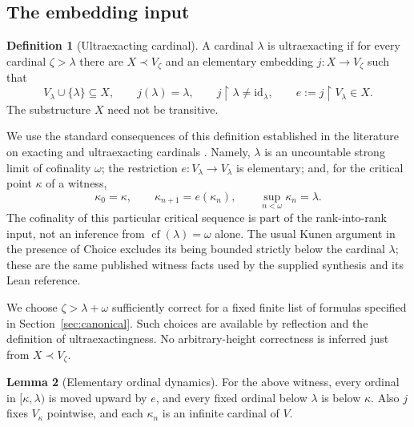 \documentclass[11pt,letterpaper]{article}
\theoremstyle{definition}
\newtheorem{definition}{Definition}[section]
\newtheorem{lemma}[definition]{Lemma}
\numberwithin{equation}{section}
\newcommand{\cf}{\operatorname{cf}}
\newcommand{\id}{\mathrm{id}}
\newcommand{\restr}{\mathbin{\upharpoonright}}
\begin{document}
\subsection{The embedding input}

\begin{definition}[Ultraexacting cardinal]
A cardinal $\lambda$ is ultraexacting if for every cardinal $\zeta>\lambda$ there are $X\prec V_\zeta$ and an elementary embedding $j:X\to V_\zeta$ such that
\[
 V_\lambda\cup\{\lambda\}\subseteq X,\qquad j(\lambda)=\lambda,
 \qquad j\restr\lambda\ne\id_\lambda,
 \qquad e:=j\restr V_\lambda\in X.
\]
The substructure $X$ need not be transitive.
\end{definition}

We use the standard consequences of this definition established in the literature on exacting and ultraexacting cardinals \cite{abl,abgl}. Namely, $\lambda$ is an uncountable strong limit of cofinality $\omega$; the restriction $e:V_\lambda\to V_\lambda$ is elementary; and, for the critical point $\kappa$ of a witness,
\begin{equation}\label{eq:crit}
 \kappa_0=\kappa,\qquad \kappa_{n+1}=e(\kappa_n),\qquad
 \sup_{n<\omega}\kappa_n=\lambda.
\end{equation}
The cofinality of this particular critical sequence is part of the rank-into-rank input, not an inference from $\cf(\lambda)=\omega$ alone. The usual Kunen argument in the presence of Choice excludes its being bounded strictly below the cardinal $\lambda$; these are the same published witness facts used by the supplied synthesis and its Lean reference.

We choose $\zeta>\lambda+\omega$ sufficiently correct for a fixed finite list of formulas specified in Section~\ref{sec:canonical}. Such choices are available by reflection and the definition of ultraexactingness. No arbitrary-height correctness is inferred just from $X\prec V_\zeta$.

\begin{lemma}[Elementary ordinal dynamics]\label{lem:dynamics}
For the above witness, every ordinal in $[\kappa,\lambda)$ is moved upward by $e$, and every fixed ordinal below $\lambda$ is below $\kappa$. Also $j$ fixes $V_\kappa$ pointwise, and each $\kappa_n$ is an infinite cardinal of $V$.
\end{lemma}
\end{document}
